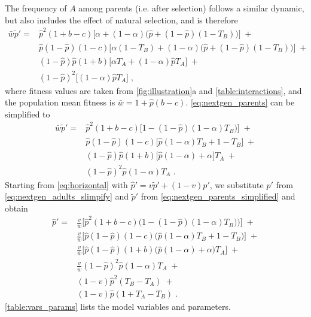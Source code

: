 \documentclass[12pt]{extarticle}
\begin{document}
The frequency of $A$ among parents (i.e. after selection) follows a similar dynamic, but also includes the effect of natural selection, and is therefore
\begin{equation}\label{eq:nextgen_parents}
\begin{aligned}
\bar{w} \tilde{p}' =
& \hat{p}^2 (1+b-c) \big[\alpha + (1-\alpha)\big(\hat{p} + (1-\hat{p})(1-T_B)\big)\big] \;+ \\
& \hat{p}(1-\hat{p}) (1-c) \big[\alpha(1-T_B) + (1-\alpha)\big(\hat{p} + (1-\hat{p})(1-T_B)\big)\big] \;+ \\
& (1-\hat{p})\hat{p} (1+b) \big[\alpha T_A + (1-\alpha) \hat{p} T_A \big] \;+ \\
& (1-\hat{p})^2 \big[(1-\alpha) \hat{p} T_A \big] \;,
\end{aligned}
\end{equation}
where fitness values are taken from \autoref{fig:illustration}a and \autoref{table:interactions}, and the population mean fitness is
$\bar{w} =  1 + \hat{p}(b-c)$.
\autoref{eq:nextgen_parents} can be simplified to
\begin{equation}\label{eq:nextgen_parents_simplified}
\begin{aligned}
\bar{w} \tilde{p}' =
& \hat{p}^2 (1+b-c) \big[1-(1-\hat{p})(1-\alpha)T_B)\big] \;+ \\
& \hat{p}(1-\hat{p}) (1-c) \big[\hat{p}(1-\alpha)T_B+1-T_B \big] \;+ \\
& (1-\hat{p})\hat{p} (1+b) \big[\hat{p}(1-\alpha) + \alpha \big] T_A \;+ \\
& (1-\hat{p})^2 \hat{p} (1-\alpha) T_A \;.
\end{aligned}
\end{equation}
Starting from \autoref{eq:horizontal} with $\hat{p}'=v\tilde{p}'+(1-v)p'$, we substitute $p'$ from \autoref{eq:nextgen_adults_slimpify} and $\tilde{p}'$ from \autoref{eq:nextgen_parents_simplified} and obtain
\begin{equation} \label{eq:nextgen_juveniles}
\begin{aligned}
\hat{p}' =
& \frac{v}{\bar{w}}\Big[\hat{p}^2(1+b-c)\Big(1-(1-\hat{p})(1-\alpha)T_B)\Big)\Big] \;+ \\
& \frac{v}{\bar{w}}\Big[ \hat{p}(1-\hat{p})(1-c)\big( \hat{p}(1-\alpha)T_B + 1 - T_B \big) \Big] \;+ \\
& \frac{v}{\bar{w}}\Big[ \hat{p}(1-\hat{p})(1+b)\big(\hat{p}(1-\alpha) + \alpha \big) T_A \Big] \;+ \\
& \frac{v}{\bar{w}}(1-\hat{p})^2\hat{p}(1-\alpha)T_A \;+ \\
& (1-v)\hat{p}^2(T_B-T_A) \;+ \\
& (1-v)\hat{p}(1+T_A-T_B) \;.
\end{aligned}
\end{equation}
\autoref{table:vars_params} lists the model variables and parameters.
\end{document}
